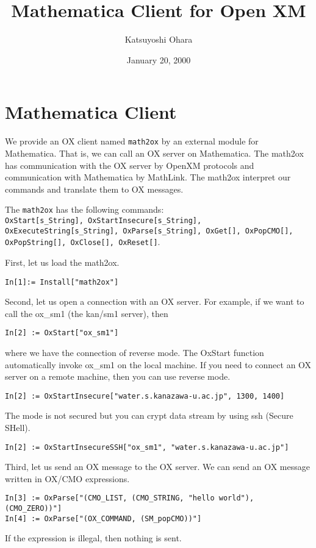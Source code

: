 \documentclass{article}
\title{Mathematica Client for Open XM}
\date{January 20, 2000}
\author{Katsuyoshi Ohara}
\begin{document}
\maketitle

\section{Mathematica Client}

We provide an OX client named {\tt math2ox} by an external module for
Mathematica. That is, we can call an OX server on Mathematica.  The
math2ox has communication with the OX server by OpenXM protocols and
communication with Mathematica by MathLink.  The math2ox interpret our
commands and translate them to OX messages.

The {\tt math2ox} has the following commands:\\
{\tt OxStart[s\_String], OxStartInsecure[s\_String],
OxExecuteString[s\_String], OxParse[s\_String], OxGet[], OxPopCMO[],
OxPopString[], OxClose[], OxReset[]}.

First, let us load the math2ox.
\begin{verbatim}
In[1]:= Install["math2ox"]
\end{verbatim}

Second, let us open a connection with an OX server.
For example, if we want to call the ox\_sm1 (the kan/sm1 server), then
\begin{verbatim}
In[2] := OxStart["ox_sm1"]
\end{verbatim}
where we have the connection of reverse mode.  The OxStart function
automatically invoke ox\_sm1 on the local machine.  If you need to
connect an OX server on a remote machine, then you can use reverse mode.
\begin{verbatim}
In[2] := OxStartInsecure["water.s.kanazawa-u.ac.jp", 1300, 1400]
\end{verbatim}
The mode is not secured but you can crypt data stream by using ssh
(Secure SHell).
\begin{verbatim}
In[2] := OxStartInsecureSSH["ox_sm1", "water.s.kanazawa-u.ac.jp"]
\end{verbatim}

Third, let us send an OX message to the OX server.
We can send an OX message written in OX/CMO expressions.
\begin{verbatim}
In[3] := OxParse["(CMO_LIST, (CMO_STRING, "hello world"), (CMO_ZERO))"]
In[4] := OxParse["(OX_COMMAND, (SM_popCMO))"]
\end{verbatim}
If the expression is illegal, then nothing is sent.
\end{document}
